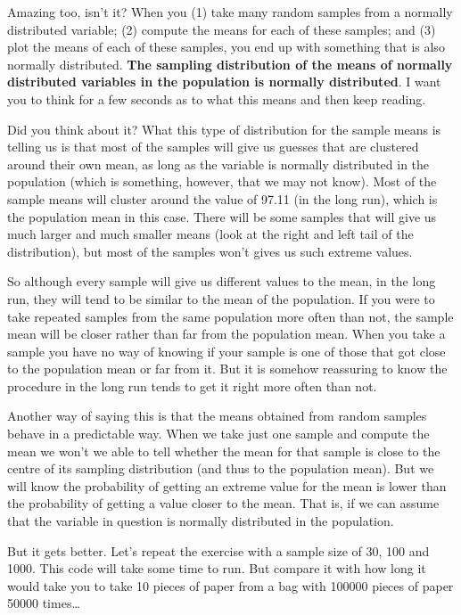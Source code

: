 \documentclass[
]{book}
\begin{document}
Amazing too, isn't it? When you (1) take many random samples from a normally distributed variable; (2) compute the means for each of these samples; and (3) plot the means of each of these samples, you end up with something that is also normally distributed. \textbf{The sampling distribution of the means of normally distributed variables in the population is normally distributed}. I want you to think for a few seconds as to what this means and then keep reading.

Did you think about it? What this type of distribution for the sample means is telling us is that most of the samples will give us guesses that are clustered around their own mean, as long as the variable is normally distributed in the population (which is something, however, that we may not know). Most of the sample means will cluster around the value of 97.11 (in the long run), which is the population mean in this case. There will be some samples that will give us much larger and much smaller means (look at the right and left tail of the distribution), but most of the samples won't gives us such extreme values.

So although every sample will give us different values to the mean, in the long run, they will tend to be similar to the mean of the population. If you were to take repeated samples from the same population more often than not, the sample mean will be closer rather than far from the population mean. When you take a sample you have no way of knowing if your sample is one of those that got close to the population mean or far from it. But it is somehow reassuring to know the procedure in the long run tends to get it right more often than not.

Another way of saying this is that the means obtained from random samples behave in a predictable way. When we take just one sample and compute the mean we won't we able to tell whether the mean for that sample is close to the centre of its sampling distribution (and thus to the population mean). But we will know the probability of getting an extreme value for the mean is lower than the probability of getting a value closer to the mean. That is, if we can assume that the variable in question is normally distributed in the population.

But it gets better. Let's repeat the exercise with a sample size of 30, 100 and 1000. This code will take some time to run. But compare it with how long it would take you to take 10 pieces of paper from a bag with 100000 pieces of paper 50000 times\ldots{}
\end{document}
